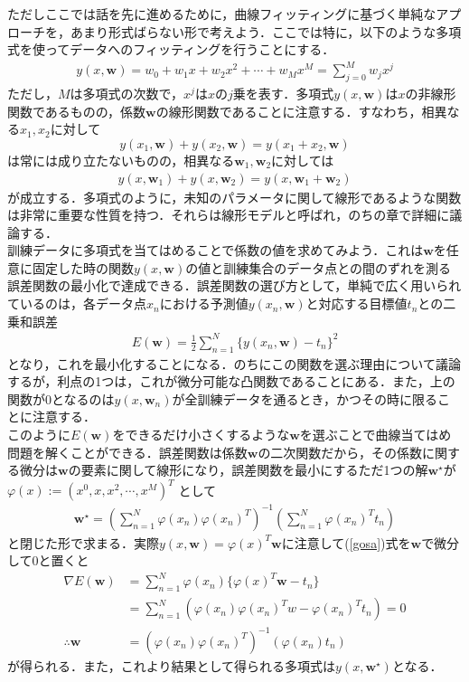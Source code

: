 \documentclass{jsarticle}
\theoremstyle{definition}
\numberwithin{equation}{section}
\begin{document}
ただしここでは話を先に進めるために，曲線フィッティングに基づく単純なアプローチを，あまり形式ばらない形で考えよう．ここでは特に，以下のような多項式を使ってデータへのフィッティングを行うことにする．
\begin{equation}
\begin{split}
y(x,{\bm w}) = w_0 + w_1x + w_2x^2 + \cdots + w_Mx^M = \sum_{j=0}^M w_j x^j
\end{split}
\end{equation}
ただし，$M$は多項式の次数で，$x^j$は$x$の$j$乗を表す．多項式$y(x,{\bm w})$は$x$の非線形関数であるものの，係数${\bm w}$の線形関数であることに注意する．すなわち，相異なる$x_1,x_2$に対して
$$y(x_1,{\bm w}) + y(x_2,{\bm w}) = y(x_1+x_2,{\bm w})$$
は常には成り立たないものの，相異なる${\bm w}_1,{\bm w}_2$に対しては
\begin{align*}
  y(x,{\bm w}_1) + y(x,{\bm w}_2) = y(x,{\bm w}_1 + {\bm w}_2)
\end{align*}
が成立する．多項式のように，未知のパラメータに関して線形であるような関数は非常に重要な性質を持つ．それらは線形モデルと呼ばれ，のちの章で詳細に議論する．\\
訓練データに多項式を当てはめることで係数の値を求めてみよう．これは${\bm w}$を任意に固定した時の関数$y(x,{\bm w})$の値と訓練集合のデータ点との間のずれを測る誤差関数の最小化で達成できる．誤差関数の選び方として，単純で広く用いられているのは，各データ点$x_n$における予測値$y(x_n,{\bm w})$と対応する目標値$t_n$との二乗和誤差
\begin{align}
  \label{gosa}
E({\bm w}) = \frac{1}{2}\sum_{n=1}^N\{y(x_n,{\bm w}) - t_n\}^2
\end{align}
となり，これを最小化することになる．のちにこの関数を選ぶ理由について議論するが，利点の1つは，これが微分可能な凸関数であることにある．また，上の関数が$0$となるのは$y(x,{\bm w}_n)$が全訓練データを通るとき，かつその時に限ることに注意する．\\


このように$E({\bm w})$をできるだけ小さくするような$\bm w$を選ぶことで曲線当てはめ問題を解くことができる．誤差関数は係数$\bm w$の二次関数だから，その係数に関する微分は$\bm w$の要素に関して線形になり，誤差関数を最小にするただ1つの解$\bm w^{\star}$が
$\varphi(x) := (x^0 ,x,x^2,\cdots,x^M)^T$
として
\begin{align*}
\bm w^{\star} = \left( \sum_{n=1}^N\varphi(x_n)\varphi(x_n)^T \right)^{-1}\left( \sum_{n=1}^N\varphi(x_n)^T t_n \right)
\end{align*}
と閉じた形で求まる．実際$y(x,\bm w) = \varphi(x)^T \bm w$に注意して(\ref{gosa})式を${\bm w}$で微分して$0$と置くと
\begin{align*}
\nabla E(\bm w) &= \sum_{n=1}^N\varphi(x_n)\{\varphi(x)^T \bm w-t_n\}\\
                &= \sum_{n = 1}^N (\varphi(x_n)\varphi(x_n)^Tw - \varphi(x_n)^T t_n) = 0\\
                \therefore \bm w &= (\varphi(x_n) \varphi(x_n)^T)^{-1}(\varphi(x_n)t_n)
\end{align*}
が得られる．また，これより結果として得られる多項式は$y(x,\bm w^{\star})$となる．\\
\end{document}
